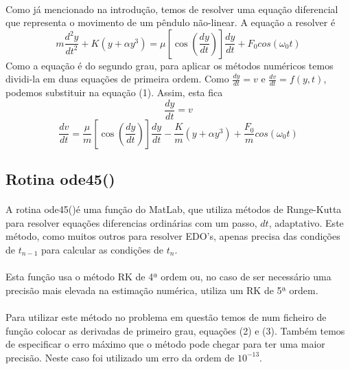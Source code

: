 \documentclass[a4paper, 11pt]{article}
\newcommand{\ode}{{\fontfamily{pcr}\selectfont ode45()}}
\newcommand{\dydt}{\frac{dy}{dt}}
\newcommand{\overm}[1]{\frac{#1}{m}}
\begin{document}
	\paragraph{}
	Como já mencionado na introdução, temos de resolver uma equação diferencial que representa o movimento de um pêndulo não-linear. A equação a resolver é
	\begin{equation}
		m\frac{d^2y}{dt^2}+K(y+\alpha y^3)=\mu \left[ \cos \left( \dydt \right) \right]\dydt+F_{0}cos(\omega_{0}t)
	\end{equation}
	Como a equação é do segundo grau, para aplicar os métodos numéricos temos dividi-la em duas equações de primeira ordem. Como $\dydt = v$ e $\frac{dv}{dt}=f(y,t)$, podemos substituir na equação (1). Assim, esta fica
	\begin{equation}
		\dydt = v 
	\end{equation}
	\begin{equation}
		\frac{dv}{dt} =  \overm{\mu} \left[ \cos \left( \dydt \right) \right]\dydt-\overm{K}(y+\alpha y^3)+\overm{F_{0}}cos(\omega_{0}t)
	\end{equation}
	
	\subsection{Rotina \ode}
	\paragraph{}
	A rotina \ode é uma função do MatLab, que utiliza métodos de Runge-Kutta para resolver equações diferencias ordinárias com um passo, $dt$, adaptativo. Este método, como muitos outros para resolver EDO's, apenas precisa das condições de $t_{n-1}$ para calcular as condições de $t_{n}$.
	\paragraph{}
	Esta função usa o método RK de 4ª ordem ou, no caso de ser necessário uma precisão mais elevada na estimação numérica, utiliza um RK de 5ª ordem.
	\paragraph{}
	Para utilizar este método no problema em questão temos de num ficheiro de função colocar as derivadas de primeiro grau, equações (2) e (3). Também temos de especificar o erro máximo que o método pode chegar para ter uma maior precisão. Neste caso foi utilizado um erro da ordem de $10^{-13}$.
\end{document}
